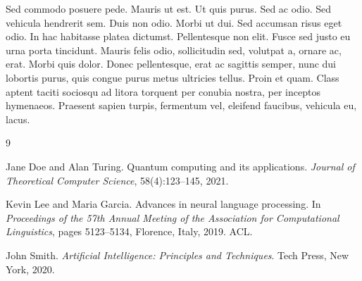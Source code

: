 \documentclass[12pt,a4paper,twoside,openright]{report}
\begin{document}
Sed commodo posuere pede. Mauris ut est. Ut quis purus. Sed ac odio. Sed vehicula hendrerit sem. Duis non odio. Morbi ut dui. Sed accumsan risus eget odio. In hac habitasse platea dictumst. Pellentesque non elit. Fusce sed justo eu urna porta tincidunt. Mauris felis odio, sollicitudin sed, volutpat a, ornare ac, erat. Morbi quis dolor. Donec pellentesque, erat ac sagittis semper, nunc dui lobortis purus, quis congue purus metus ultricies tellus. Proin et quam. Class aptent taciti sociosqu ad litora torquent per conubia nostra, per inceptos hymenaeos. Praesent sapien turpis, fermentum vel, eleifend faucibus, vehicula eu, lacus.

\cleardoublepage


\begin{thebibliography}{9}

Jane Doe and Alan Turing. Quantum computing and its applications. \emph{Journal of Theoretical Computer Science}, 58(4):123--145, 2021.

Kevin Lee and Maria Garcia. Advances in neural language processing. In \emph{Proceedings of the 57th Annual Meeting of the Association for Computational Linguistics}, pages 5123--5134, Florence, Italy, 2019. ACL.

John Smith. \emph{Artificial Intelligence: Principles and Techniques}. Tech Press, New York, 2020.

\end{thebibliography}
\end{document}
